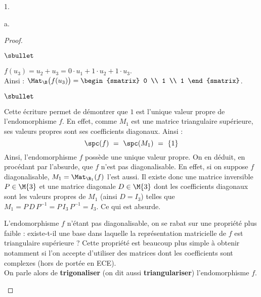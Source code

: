 \documentclass[11pt]{article}%
\begin{document}
\begin{noliste}{1.}
\begin{noliste}{a.}
\begin{proof}
\begin{noliste}{$\sbullet$}
      \item $f(u_3) = u_2 + u_3 = 0 \cdot u_1 + 1 \cdot u_2 + 1 \cdot
        u_3$.\\[.1cm]
        Ainsi : $\Mat_{\B}\big( f(u_3) \big) =
        \begin{smatrix}
          0 \\
          1 \\
          1
        \end{smatrix}
        $.
      \end{noliste}
      \begin{remarkL}{.98}%
        \begin{noliste}{$\sbullet$}
        \item Cette écriture permet de démontrer que $1$ est l'unique
          valeur propre de l'endomorphisme $f$. En effet, comme $M_1$
          est une matrice triangulaire supérieure, ses valeurs propres
          sont ses coefficients diagonaux. Ainsi :
          \[
          \spc(f) \ = \ \spc(M_1) \ = \ \{ 1 \}
          \]
          Ainsi, l'endomorphisme $f$ possède une unique valeur
          propre. On en déduit, en procédant par l'absurde, que $f$
          n'est pas diagonalisable. En effet, si on suppose $f$
          diagonalisable, $M_1 = \Mat_{\B_1}(f)$ l'est aussi. Il
          existe donc une matrice inversible $P \in \M{3}$ et une
          matrice diagonale $D \in \M{3}$ dont les coefficients
          diagonaux sont les valeurs propres de $M_1$ (ainsi $D =
          I_3$) telles que $M_1 = P \, D \, P^{-1} = P \, I_3 \,
          P^{-1} = I_3$. Ce qui est absurde.

        \item L'endomorphisme $f$ n'étant pas diagonalisable, on se
          rabat sur une propriété plus faible : existe-t-il une base
          dans laquelle la représentation matricielle de $f$ est
          triangulaire supérieure ? Cette propriété est beaucoup plus
          simple à obtenir notamment si l'on accepte d'utiliser des
          matrices dont les coefficients sont complexes (hors de
          portée en ECE).\\
          On parle alors de {\bf trigonaliser} (on dit aussi {\bf
            triangulariser}) l'endomorphisme $f$.


\end{noliste}
\end{remarkL}
\end{proof}
\end{noliste}
\end{noliste}
\end{document}
